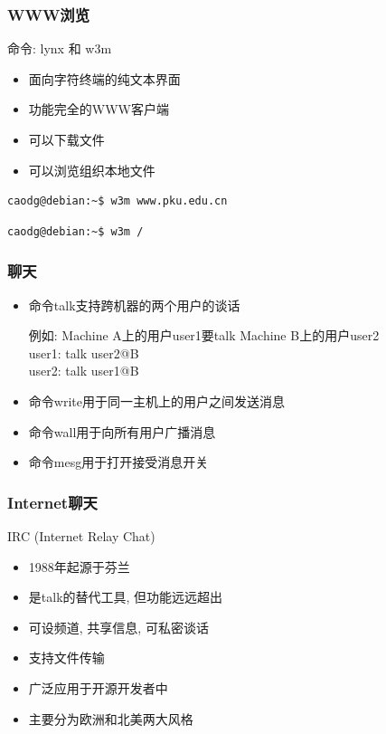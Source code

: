 \documentclass[compress]{beamer}
\begin{document}
\begin{frame}[containsverbatim]
\frametitle{WWW浏览}

命令: lynx 和 w3m

\begin{itemize}
\item 面向字符终端的纯文本界面
\item 功能完全的WWW客户端
\item 可以下载文件
\item 可以浏览组织本地文件
\end{itemize}

\begin{Verbatim}
caodg@debian:~$ w3m www.pku.edu.cn
\end{Verbatim}

\begin{Verbatim}
caodg@debian:~$ w3m /
\end{Verbatim}


\end{frame}

\begin{frame}
\frametitle{聊天}

\begin{itemize}
\item 命令\alert{talk}支持跨机器的两个用户的谈话

例如: Machine A上的用户user1要talk Machine B上的用户user2\\
user1: talk user2@B\\
user2: talk user1@B

\item 命令\alert{write}用于同一主机上的用户之间发送消息

\item 命令\alert{wall}用于向所有用户广播消息

\item 命令\alert{mesg}用于打开接受消息开关
\end{itemize}


\end{frame}

\begin{frame}
  \frametitle{Internet聊天}
  IRC (Internet Relay Chat)
  \begin{itemize}
	\item 1988年起源于芬兰
	\item 是talk的替代工具, 但功能远远超出
	\item 可设频道, 共享信息, 可私密谈话
	\item 支持文件传输
	\item 广泛应用于开源开发者中
	\item 主要分为欧洲和北美两大风格
  \end{itemize}
  
\end{frame}
\end{document}
